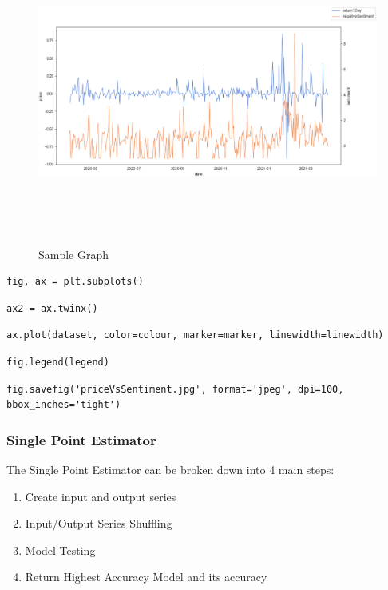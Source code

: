 \begin{figure}[h!]
    \centering
    \includegraphics[width=15cm,height=10cm,keepaspectratio]{implementation/sampleGraph.png}
    \caption{Sample Graph}
    \label{fig:sampleGraph}
\end{figure}

\begin{lstlisting}[caption=Split Window into Multiple Subplots]
    fig, ax = plt.subplots()  
\end{lstlisting}
\begin{lstlisting}[caption=Create Overlapping Subplot]
    ax2 = ax.twinx()
\end{lstlisting}
\begin{lstlisting}[caption=Plot Dataset]
    ax.plot(dataset, color=colour, marker=marker, linewidth=linewidth) 
\end{lstlisting}
\begin{lstlisting}[caption=Plot Legend]
    fig.legend(legend)
\end{lstlisting}
\begin{lstlisting}[caption=Save picture of plot]
    fig.savefig('priceVsSentiment.jpg', format='jpeg', dpi=100, bbox_inches='tight')
\end{lstlisting}

\subsubsection{Single Point Estimator}

The Single Point Estimator can be broken down into 4 main steps:
\begin{enumerate}
    \item Create input and output series
    \item Input/Output Series Shuffling
    \item Model Testing
    \item Return Highest Accuracy Model and its accuracy
\end{enumerate}

